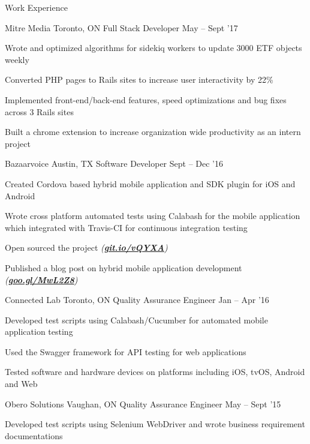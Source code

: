 \documentclass{resume} %
\begin{document}
	\begin{rSection}{Work Experience}
		
		
		
		\begin{rSubsection}{Mitre Media}
			{Toronto, ON}
			{Full Stack Developer}
			{May -- Sept '17}
			
			\item Wrote and optimized algorithms for sidekiq workers to update 3000 ETF objects weekly
			\item Converted PHP pages to Rails sites to increase user interactivity by 22\%
			\item Implemented front-end/back-end features, speed optimizations and bug fixes across 3 Rails sites
			\item Built a chrome extension to increase organization wide productivity as an intern project
		\end{rSubsection}
		
		\begin{rSubsection}{Bazaarvoice}
			{Austin, TX}
			{Software Developer}
			{Sept -- Dec '16}
			
			\item Created Cordova based hybrid mobile application and SDK plugin for iOS and Android
			\item Wrote cross platform automated tests using Calabash for the mobile application which integrated with Travis-CI for continuous integration testing
			\item Open sourced the project {\em (\href{https://git.io/vQYXA}{\textbf{git.io/vQYXA}})} 
			\item Published a blog post on hybrid mobile application development {\em (\href{https://goo.gl/MwL2Z8}{\textbf{goo.gl/MwL2Z8}})} 
		\end{rSubsection}
		
		\begin{rSubsection}{Connected Lab}
			{Toronto, ON}
			{Quality Assurance Engineer}
			{Jan -- Apr '16}
			
			\item Developed test scripts using Calabash/Cucumber for automated mobile application testing
			\item Used the Swagger framework for API testing for web applications
			\item Tested software and hardware devices on platforms including iOS, tvOS, Android and Web
		\end{rSubsection}
		
		\begin{rSubsection}{Obero Solutions}
			{Vaughan, ON}
			{Quality Assurance Engineer}
			{May -- Sept '15}
			
			\item Developed test scripts using Selenium WebDriver and wrote business requirement documentations
			
		\end{rSubsection}
	\end{rSection}
	
\end{document}
